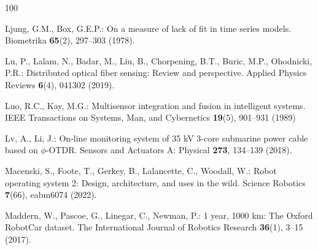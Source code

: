 \documentclass[graybox,envcountchap]{style/SNmono}
\begin{document}
\begin{thebibliography}{100}
{\par}

Ljung, G.M., Box, G.E.P.: On a measure of lack of fit in time series models.
\newblock Biometrika \textbf{65}(2), 297--303 (1978).
\newblock {}



Lu, P., Lalam, N., Badar, M., Liu, B., Chorpening, B.T., Buric, M.P.,
  Ohodnicki, P.R.: Distributed optical fiber sensing: Review and perspective.
\newblock Applied Physics Reviews \textbf{6}(4), 041302 (2019).
\newblock {}


{\color{red} 
Luo, R.C., Kay, M.G.: Multisensor integration and fusion in intelligent
  systems.
\newblock IEEE Transactions on Systems, Man, and Cybernetics \textbf{19}(5),
  901--931 (1989)

\par}

Lv, A., Li, J.: On-line monitoring system of 35 {kV} 3-core submarine power
  cable based on {$\phi$-OTDR}.
\newblock Sensors and Actuators A: Physical \textbf{273}, 134--139 (2018).
\newblock {}



Macenski, S., Foote, T., Gerkey, B., Lalancette, C., Woodall, W.: Robot
  operating system 2: Design, architecture, and uses in the wild.
\newblock Science Robotics \textbf{7}(66), eabm6074 (2022).
\newblock {}



Maddern, W., Pascoe, G., Linegar, C., Newman, P.: 1 year, 1000 km: The {O}xford
  {R}obot{C}ar dataset.
\newblock The International Journal of Robotics Research \textbf{36}(1), 3--15
  (2017).
\newblock {}



\end{thebibliography}
\end{document}

